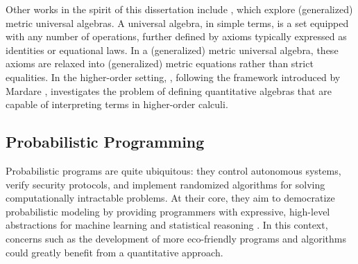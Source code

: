 Other works in the spirit of this dissertation include \cite{mardare2016quantitative, mardare2017axiomatizability, mio24, jurka24}, which explore (generalized) metric universal algebras. A universal algebra, in simple terms, is a set equipped with any number of operations, further defined  by axioms typically expressed as identities or equational laws. In a (generalized) metric universal algebra, these axioms are relaxed into (generalized) metric equations rather than strict equalities. In the higher-order setting, \cite{lago22}, following the framework introduced by Mardare \cite{mardare2016quantitative}, investigates the problem of defining quantitative algebras that are capable of interpreting terms in higher-order calculi.





\subsection*{Probabilistic Programming}

Probabilistic programs are quite  ubiquitous: they control autonomous systems, verify security protocols, and implement randomized algorithms for solving computationally intractable problems. At their core, they aim to democratize probabilistic modeling by providing programmers with expressive, high-level abstractions for machine learning and statistical reasoning \cite{bartheFoundationsProbabilisticProgramming2020}. In this context, concerns such as the development of more eco-friendly programs and algorithms could greatly benefit from a quantitative approach.







